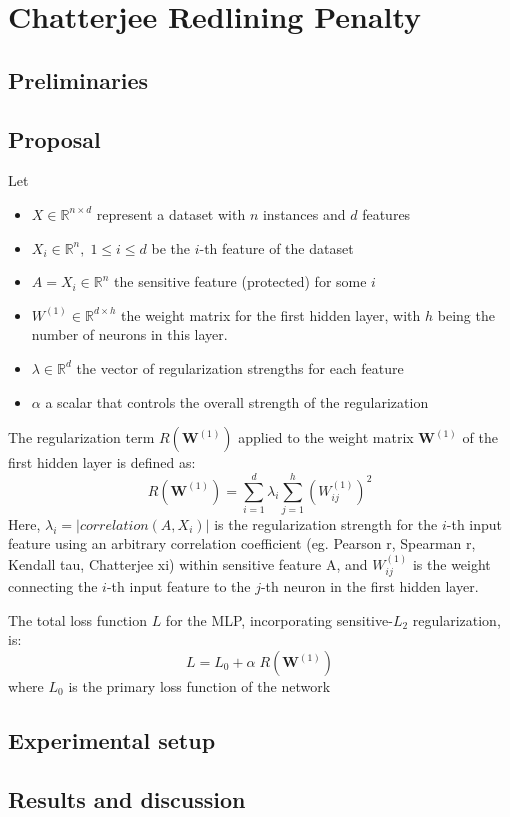 \chapter{Chatterjee Redlining Penalty}

\section{Preliminaries}

\section{Proposal}

Let

\begin{itemize}
    \item $X \in \mathbb{R}^{n\times d}$ represent a dataset with $n$ instances and $d$ features
    \item $X_i \in \mathbb{R}^n, \; 1 \leq i \leq d$ be the $i$-th feature of the dataset
    \item $A = X_i \in \mathbb{R}^n$ the sensitive feature (protected) for some $i$
    \item $W^{(1)} \in \mathbb{R}^{d \times h}$ the weight matrix for the first hidden layer, with $h$ being the number of neurons in this layer.
    \item $\lambda \in \mathbb{R}^{d}$ the vector of regularization strengths for each feature
    \item $\alpha$  a scalar that controls the overall strength of the regularization
\end{itemize}

The regularization term $R(\mathbf{W}^{(1)})$ applied to the weight matrix $\mathbf{W}^{(1)}$ of the first hidden layer is defined as:
$$R(\mathbf{W}^{(1)}) = \sum_{i=1}^d \lambda_i \sum_{j=1}^h (W^{(1)}_{ij})^2$$
Here, $\lambda_i = |correlation(A,X_i)|$ is the regularization strength for the $i$-th input feature using an arbitrary correlation coefficient (eg. Pearson r, Spearman r, Kendall tau, Chatterjee xi) within sensitive feature A, and $W^{(1)}_{ij}$ is the weight connecting the $i$-th input feature to the $j$-th neuron in the first hidden layer.

The total loss function $L$ for the MLP, incorporating sensitive-$L_2$ regularization, is:
$$L = L_0 + \alpha \; R(\mathbf{W}^{(1)})$$
where $L_0$ is the primary loss function of the network


\section{Experimental setup}

\section{Results and discussion}
